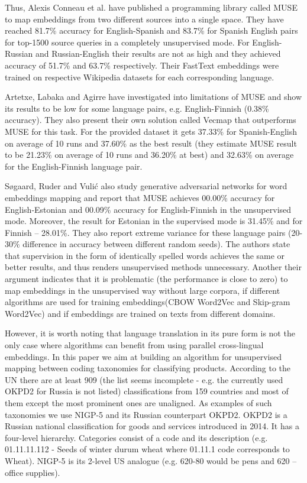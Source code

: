 \documentclass[11pt,a4paper]{article}
\begin{document}
Thus, Alexis Conneau et al. \cite{muse} have published a programming library called MUSE to map embeddings from two different sources into a single space. They have reached 81.7\% accuracy for English-Spanish and 83.7\% for Spanish English pairs for top-1500 source queries in a completely unsupervised mode. For English-Russian and Russian-English their results are not as high and they achieved accuracy of 51.7\% and 63.7\% respectively. Their FastText embeddings were trained on respective Wikipedia datasets for each corresponding language. 

Artetxe, Labaka and Agirre have investigated into limitations of MUSE and show its results to be low for some language pairs, e.g. English-Finnish (0.38\% accuracy). They also present their own solution called Vecmap \cite{vecmap} that outperforms MUSE for this task. For the provided dataset it gets 37.33\% for Spanish-English on average of 10 runs and 37.60\% as the best result (they estimate MUSE result to be 21.23\% on average of 10 runs and 36.20\% at best) and 32.63\% on average for the English-Finnish language pair.

Søgaard, Ruder and Vulić \cite{ruder-muse-limitations} also study generative adversarial networks for word embeddings mapping and report that MUSE achieves 00.00\% accuracy for English-Estonian and 00.09\% accuracy for English-Finnish in the unsupervised mode. Moreover, the result for Estonian in the supervised mode is 31.45\% and for Finnish -- 28.01\%. They also report extreme variance for these language pairs (20-30\% difference in accuracy between different random seeds). The authors state that supervision in the form of identically spelled words achieves the same or better results, and thus renders unsupervised methods unnecessary. Another their argument indicates that it is problematic (the performance is close to zero) to map embeddings in the unsupervised way without large corpora, if different algorithms are used for training embeddings(CBOW Word2Vec and Skip-gram Word2Vec) and if embeddings are trained on texts from different domains.

However, it is worth noting that language translation in its pure form is not the only case where algorithms can benefit from using parallel cross-lingual embeddings. In this paper we aim at building an algorithm for unsupervised mapping between coding taxonomies for classifying products. According to the UN \cite{unsd} there are at least 909 (the list seems incomplete - e.g. the currently used OKPD2 for Russia is not listed) classifications from 159 countries and most of them except the most prominent ones are unaligned. As examples of such taxonomies we use NIGP-5 and its Russian counterpart OKPD2. OKPD2 is a Russian national classification for goods and services introduced in 2014. It has a four-level hierarchy. Categories consist of a code and its description (e.g. 01.11.11.112 - Seeds of winter durum wheat where 01.11.1 code corresponds to Wheat). NIGP-5 is its 2-level US analogue (e.g. 620-80 would be pens and 620 -- office supplies).
\end{document}
